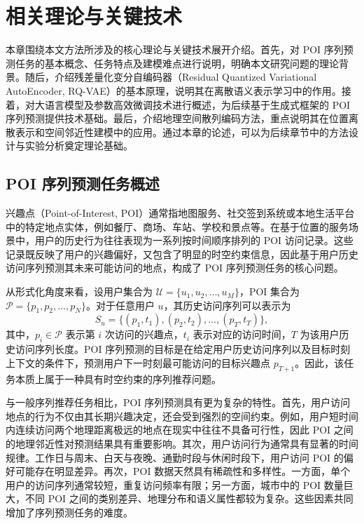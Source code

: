 \chapter{相关理论与关键技术}
\label{cha:theory}

本章围绕本文方法所涉及的核心理论与关键技术展开介绍。首先，对 POI 序列预测任务的基本概念、任务特点及建模难点进行说明，明确本文研究问题的理论背景。随后，介绍残差量化变分自编码器（Residual Quantized Variational AutoEncoder, RQ-VAE）的基本原理，说明其在离散语义表示学习中的作用。接着，对大语言模型及参数高效微调技术进行概述，为后续基于生成式框架的 POI 序列预测提供技术基础。最后，介绍地理空间散列编码方法，重点说明其在位置离散表示和空间邻近性建模中的应用。通过本章的论述，可以为后续章节中的方法设计与实验分析奠定理论基础。

\section{POI 序列预测任务概述}
\label{sec:poi_sequence_prediction}

兴趣点（Point-of-Interest, POI）通常指地图服务、社交签到系统或本地生活平台中的特定地点实体，例如餐厅、商场、车站、学校和景点等。在基于位置的服务场景中，用户的历史行为往往表现为一系列按时间顺序排列的 POI 访问记录。这些记录既反映了用户的兴趣偏好，又包含了明显的时空约束信息，因此基于用户历史访问序列预测其未来可能访问的地点，构成了 POI 序列预测任务的核心问题。

从形式化角度来看，设用户集合为 $\mathcal{U}=\{u_1,u_2,\dots,u_M\}$，POI 集合为 $\mathcal{P}=\{p_1,p_2,\dots,p_N\}$。对于任意用户 $u$，其历史访问序列可以表示为
\begin{equation}
S_u=\{(p_1,t_1),(p_2,t_2),\dots,(p_T,t_T)\},
\end{equation}
其中，$p_i \in \mathcal{P}$ 表示第 $i$ 次访问的兴趣点，$t_i$ 表示对应的访问时间，$T$ 为该用户历史访问序列长度。POI 序列预测的目标是在给定用户历史访问序列以及目标时刻上下文的条件下，预测用户下一时刻最可能访问的目标兴趣点 $p_{T+1}$。因此，该任务本质上属于一种具有时空约束的序列推荐问题。

与一般序列推荐任务相比，POI 序列预测具有更为复杂的特性。首先，用户访问地点的行为不仅由其长期兴趣决定，还会受到强烈的空间约束。例如，用户短时间内连续访问两个地理距离极远的地点在现实中往往不具备可行性，因此 POI 之间的地理邻近性对预测结果具有重要影响。其次，用户访问行为通常具有显著的时间规律。工作日与周末、白天与夜晚、通勤时段与休闲时段下，用户访问 POI 的偏好可能存在明显差异。再次，POI 数据天然具有稀疏性和多样性。一方面，单个用户的访问序列通常较短，重复访问频率有限；另一方面，城市中的 POI 数量巨大，不同 POI 之间的类别差异、地理分布和语义属性都较为复杂。这些因素共同增加了序列预测任务的难度。

